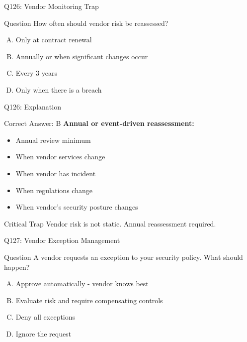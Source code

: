 \documentclass{beamer}
\begin{document}
	\begin{frame}{Q126: Vendor Monitoring Trap}
		\begin{block}{Question}
			How often should vendor risk be reassessed?
		\end{block}
		\begin{enumerate}[(A)]
			\item Only at contract renewal
			\item Annually or when significant changes occur
			\item Every 3 years
			\item Only when there is a breach
		\end{enumerate}
	\end{frame}
	
	\begin{frame}{Q126: Explanation}
		\begin{block}{Correct Answer: B}
			\textbf{Annual or event-driven reassessment:}
			\begin{itemize}
				\item Annual review minimum
				\item When vendor services change
				\item When vendor has incident
				\item When regulations change
				\item When vendor's security posture changes
			\end{itemize}
		\end{block}
		\begin{alertblock}{Critical Trap}
			Vendor risk is not static.
			Annual reassessment required.
		\end{alertblock}
	\end{frame}
	
	\begin{frame}{Q127: Vendor Exception Management}
		\begin{block}{Question}
			A vendor requests an exception to your security policy. What should happen?
		\end{block}
		\begin{enumerate}[(A)]
			\item Approve automatically - vendor knows best
			\item Evaluate risk and require compensating controls
			\item Deny all exceptions
			\item Ignore the request
		\end{enumerate}
	\end{frame}
	
\end{document}
